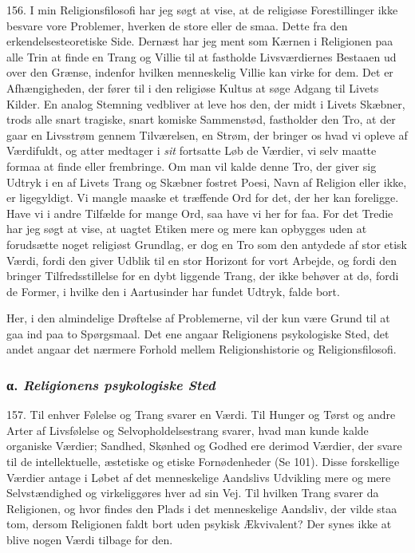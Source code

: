 \documentclass[12pt,a4paper]{book}
\newcommand{\apage}[1]{\marginnote{\footnotesize\textit{[#1]}}}
\begin{document}
156. I min Religionsfilosofi har jeg søgt at vise, at de religiøse Forestillinger ikke
besvare vore Problemer, hverken \apage{374} de store eller de smaa. Dette fra den erkendelsesteoretiske
Side. Dernæst har jeg ment som Kærnen i Religionen paa alle Trin at finde en Trang og Villie
til at fastholde Livsværdiernes Bestaaen ud over den Grænse, indenfor hvilken menneskelig
Villie kan virke for dem. Det er Afhængigheden, der fører til i den religiøse Kultus at søge
Adgang til Livets Kilder. En analog Stemning vedbliver at leve hos den, der midt i Livets
Skæbner, trods alle snart tragiske, snart komiske Sammenstød, fastholder den Tro, at der gaar
en Livsstrøm gennem Tilværelsen, en Strøm, der bringer os hvad vi opleve af Værdifuldt, og
atter medtager i \emph{sit} fortsatte Løb de Værdier, vi selv maatte formaa at finde eller
frembringe. Om man vil kalde denne Tro, der giver sig Udtryk i en af Livets Trang og Skæbner
fostret Poesi, Navn af Religion eller ikke, er ligegyldigt. Vi mangle maaske et træffende Ord
for det, der her kan foreligge. Have vi i andre Tilfælde for mange Ord, saa have vi her for faa.
For det Tredie har jeg søgt at vise, at uagtet Etiken mere og mere kan opbygges uden at
forudsætte noget religiøst Grundlag, er dog en Tro som den antydede af stor etisk Værdi,
fordi den giver Udblik til en stor Horizont for vort Arbejde, og fordi den bringer
Tilfredsstillelse for en dybt liggende Trang, der ikke behøver at dø, fordi de Former, i
hvilke den i Aartusinder har fundet Udtryk, falde bort.

Her, i den almindelige Drøftelse af Problemerne, vil der kun være Grund til at gaa ind paa to
Spørgsmaal. Det ene angaar Religionens psykologiske Sted, det andet angaar det nærmere
Forhold mellem Religionshistorie og Religionsfilosofi.

\subsubsection*{α. \emph{Religionens psykologiske Sted}}

157. Til enhver Følelse og Trang svarer en Værdi. Til Hunger og Tørst og andre Arter af
Livsfølelse og Selvopholdelsestrang svarer, hvad man kunde kalde organiske Værdier; Sandhed,
Skønhed og Godhed ere derimod Værdier, der svare til de intellektuelle, æstetiske og etiske
Fornødenheder \apage{375} (Se 101). Disse forskellige Værdier antage i Løbet af det menneskelige
Aandslivs Udvikling mere og mere Selvstændighed og virkeliggøres hver ad sin Vej. Til hvilken
Trang svarer da Religionen, og hvor findes den Plads i det menneskelige Aandsliv, der vilde
staa tom, dersom Religionen faldt bort uden psykisk Ækvivalent? Der synes ikke at blive nogen
Værdi tilbage for den.
\end{document}
